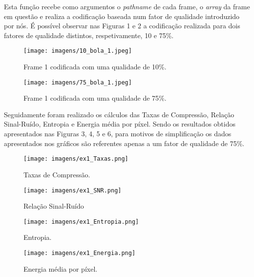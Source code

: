 \documentclass[12pt,a4paper]{article}
\begin{document}
Esta função recebe como argumentos o \textit{pathname} de cada frame, o \textit{array} da frame em questão e realiza a codificação baseada num fator de qualidade introduzido por nós. É possível observar nas Figuras 1 e 2 a codificação realizada para dois fatores de qualidade distintos, respetivamente, 10 e 75\%. 

\begin{figure}[h]
	\centering
    \begin{minipage}{0.45\textwidth}
        \centering
        \texttt{[image: imagens/10\_bola\_1.jpeg]}
        \caption{Frame 1 codificada com uma qualidade de 10\%.}
    \end{minipage}\hfill
    \begin{minipage}{0.45\textwidth}
        \centering
        \texttt{[image: imagens/75\_bola\_1.jpeg]}
        \caption{Frame 1 codificada com uma qualidade de 75\%.}
    \end{minipage}
\end{figure}

Seguidamente foram realizado os cálculos das Taxas de Compressão, Relação Sinal-Ruído, Entropia e Energia média por píxel. Sendo os resultados obtidos apresentados nas Figuras 3, 4, 5 e 6, para motivos de simplificação os dados apresentados nos gráficos são referentes apenas a um fator de qualidade de 75\%.
\begin{figure}[h]
	\centering
    \begin{minipage}{0.45\textwidth}
        \centering
        \texttt{[image: imagens/ex1\_Taxas.png]}
        \caption{Taxas de Compressão.}
    \end{minipage}\hfill
    \begin{minipage}{0.45\textwidth}
        \centering
        \texttt{[image: imagens/ex1\_SNR.png]}
        \caption{Relação Sinal-Ruído}
    \end{minipage}
\end{figure}
\begin{figure}[h]
	\centering
    \begin{minipage}{0.45\textwidth}
        \centering
        \texttt{[image: imagens/ex1\_Entropia.png]}
        \caption{Entropia.}
    \end{minipage}\hfill
    \begin{minipage}{0.45\textwidth}
        \centering
        \texttt{[image: imagens/ex1\_Energia.png]}
        \caption{Energia média por píxel.}
    \end{minipage}
\end{figure}
\newpage
\end{document}
